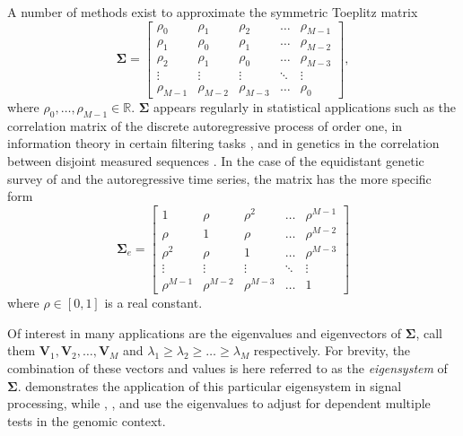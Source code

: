 \documentclass[letterpaper,12pt,oneside,final]{article}
\newcommand{\ve}[1]{\mathbf{#1}}           %
\newcommand{\sm}[1]{\boldsymbol{#1}}   %
\newcommand{\field}[1]{\mathbb{#1}}
\newcommand{\Reals}{\field{R}}
\begin{document}
A number of methods exist to approximate the symmetric Toeplitz matrix
\begin{equation} \label{eq:multipleTesting:genEigCov}
  \sm{\Sigma} = \begin{bmatrix}
    \rho_0 & \rho_1 & \rho_2 & \dots & \rho_{M-1} \\
    \rho_1 & \rho_0 & \rho_1 & \dots & \rho_{M-2} \\
    \rho_2 & \rho_1 & \rho_0 & \dots & \rho_{M-3} \\
    \vdots & \vdots & \vdots & \ddots & \vdots \\
    \rho_{M-1} & \rho_{M-2} & \rho_{M-3} & \dots & \rho_0
  \end{bmatrix},
\end{equation}
where $\rho_0, \dots, \rho_{M-1} \in \Reals$. $\sm{\Sigma}$ appears regularly in statistical applications such as the correlation matrix of the discrete autoregressive process of order one, in information theory in certain filtering tasks \cite{gray2006toeplitz}, and in genetics in the correlation between disjoint measured sequences \cite{salahub2022correlation}. In the case of the equidistant genetic survey of \cite{LanderBotstein1989} and the autoregressive time series, the matrix has the more specific form
\begin{equation} \label{eq:multipleTesting:specEigCov}
  \sm{\Sigma}_e = \begin{bmatrix}
    1 & \rho & \rho^2 & \dots & \rho^{M-1} \\
    \rho & 1 & \rho & \dots & \rho^{M-2} \\
    \rho^2 & \rho & 1 & \dots & \rho^{M-3} \\
    \vdots & \vdots & \vdots & \ddots & \vdots \\
    \rho^{M-1} & \rho^{M-2} & \rho^{M-3} & \dots & 1
  \end{bmatrix}
\end{equation}
where $\rho \in [0, 1]$ is a real constant.

Of interest in many applications are the eigenvalues and eigenvectors of $\sm{\Sigma}$, call them $\ve{V}_1, \ve{V}_2, \dots, \ve{V}_M$ and $\lambda_1 \geq \lambda_2 \geq \dots \geq \lambda_M$ respectively. For brevity, the combination of these vectors and values is here referred to as the \emph{eigensystem} of $\sm{\Sigma}$. \cite{gray2006toeplitz} demonstrates the application of this particular eigensystem in signal processing, while \cite{cheverud2001}, \cite{LiJi2005}, and \cite{Galwey2009} use the eigenvalues to adjust for dependent multiple tests in the genomic context.
\end{document}
